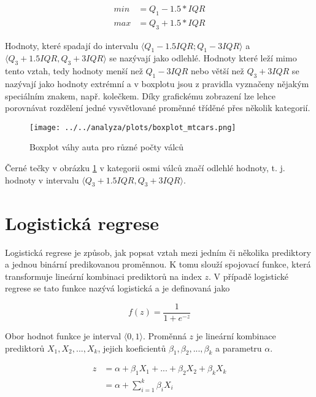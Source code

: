 \begin{align}
    min &= Q_1 - 1.5 * IQR \\
    max &= Q_3 + 1.5 * IQR
\end{align}

{\color{red}
Hodnoty, které spadají do intervalu $\langle Q_1 - 1.5IQR; Q_1 - 3IQR\rangle$ a $\langle Q_3 + 1.5IQR, Q_3 + 3IQR \rangle$ se nazývají jako odlehlé.
Hodnoty které leží mimo tento vztah, tedy hodnoty menší než $Q_1 - 3IQR$ nebo větší než $Q_3 + 3IQR$ se nazývají jako hodnoty extrémní a
v boxplotu jsou z pravidla vyznačeny nějakým speciálním znakem, např. kolečkem.
Díky grafickému zobrazení lze lehce porovnávat rozdělení jedné vysvětlované proměnné tříděné přes několik kategorií.
}

\begin{figure}[H]
    \centering
    \texttt{[image: ../../analyza/plots/boxplot\_mtcars.png]}
    \caption{Boxplot váhy auta pro různé počty válců} 
    \label{fig:boxplot_mtcars}
\end{figure}

{\color{red}
Černé tečky v obrázku \ref{fig:boxplot_mtcars} v kategorii osmi válců značí odlehlé hodnoty, t. j. hodnoty
v intervalu $\langle Q_3 + 1.5IQR, Q_3 + 3IQR \rangle$.
}

\newpage
\section{Logistická regrese}
Logistická regrese je způsob, jak popsat vztah mezi jedním či několika prediktory a jednou binární predikovanou 
proměnnou. K tomu slouží spojovací funkce, která transformuje lineární kombinaci prediktorů na index $z$. V případě
logistické regrese se tato funkce nazývá logistická a je definovaná jako

\begin{equation}
    \label{eq:logisticka_funkce}
    f(z) = \frac{1}{1 + e^{-z}}
\end{equation}

Obor hodnot funkce je interval $\langle 0, 1 \rangle$. Proměnná $z$ je lineární kombinace prediktorů  $X_1, X_2, ..., X_k$, 
jejich koeficientů $\beta_1, \beta_2, ..., \beta_k$ a parametru $\alpha$.

\begin{equation}
    \label{eq:linearni_kombinace_z}
    \begin{split}
        z &= \alpha + \beta_1 X_1 + ... + \beta_2 X_2 +\beta_k X_k \\
          &= \alpha + \sum_{i=1}^k \beta_i X_i
    \end{split}
\end{equation}

